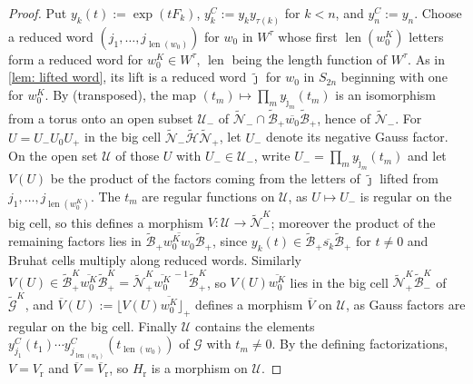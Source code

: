 \documentclass[a4paper]{amsart}
\numberwithin{equation}{section}
\theoremstyle{definition}
\theoremstyle{remark}
\newcommand{\mcG}{\mathcal{G}}
\newcommand{\mcH}{\mathcal{H}}
\newcommand{\mcN}{\mathcal{N}}
\newcommand{\mcB}{\mathcal{B}}
\newcommand{\tG}{\widetilde{\mcG}}
\newcommand{\rr}{\mathrm{r}}
\newcommand{\len}{\operatorname{len}}
\begin{document}
\begin{proof}
  Put $y_k(t):=\exp(tF_k)$, $y^C_k:=y_k y_{\tau(k)}$ for $k<n$, and $y^C_n:=y_n$.
  Choose a reduced word $(j_1,\dots,j_{\len(w_0)})$ for $w_0$ in $W^\tau$ whose first $\len(w_0^K)$ letters form a reduced word for $w_0^K\in W^\tau$, $\len$ being the length function of $W^\tau$.
  As in \cref{lem: lifted word}, its lift is a reduced word $\widetilde{\boldsymbol{\jmath}}$ for $w_0$ in $S_{2n}$ beginning with one for $w_0^K$.
  By \cite[Proposition~2.18]{FZ99} (transposed), the map $(t_m)\mapsto\prod_m y_{\widetilde{\jmath}_m}(t_m)$ is an isomorphism from a torus onto an open subset $\mathcal{U}_-$ of $\widetilde{\mcN}_-\cap\widetilde{\mcB}_+\overline{w_0}\widetilde{\mcB}_+$, hence of $\widetilde{\mcN}_-$.
  For $U=U_-U_0U_+$ in the big cell $\widetilde{\mcN}_-\widetilde{\mcH}\widetilde{\mcN}_+$, let $U_-$ denote its negative Gauss factor.
  On the open set $\mathcal{U}$ of those $U$ with $U_-\in\mathcal{U}_-$, write $U_-=\prod_m y_{\widetilde{\jmath}_m}(t_m)$ and let~$V(U)$ be the product of the factors coming from the letters of $\widetilde{\boldsymbol{\jmath}}$ lifted from $j_1,\dots,j_{\len(w_0^K)}$.
  The $t_m$ are regular functions on $\mathcal{U}$, as $U\mapsto U_-$ is regular on the big cell, so this defines a morphism $V\colon\mathcal{U}\to\widetilde{\mcN}_-^K$; moreover the product of the remaining factors lies in $\widetilde{\mcB}_+\overline{w_0^Kw_0}\widetilde{\mcB}_+$, since $y_k(t)\in\widetilde{\mcB}_+\overline{s_k}\widetilde{\mcB}_+$ for $t\neq0$ and Bruhat cells multiply along reduced words.
  Similarly $V(U)\in\widetilde{\mcB}_+^K\overline{w_0^K}\widetilde{\mcB}_+^K=\widetilde{\mcN}_+^K\overline{w_0^K}^{\,-1}\widetilde{\mcB}_+^K$, so $V(U)\overline{w_0^K}$ lies in the big cell $\widetilde{\mcN}_+^K\widetilde{\mcB}_-^K$ of $\tG^K$, and $\overline{V}(U):=\lfloor V(U)\overline{w_0^K}\rfloor_+$ defines a morphism $\overline{V}$ on $\mathcal{U}$, as Gauss factors are regular on the big cell.
  Finally $\mathcal{U}$ contains the elements $y^C_{j_1}(t_1)\cdots y^C_{j_{\len(w_0)}}(t_{\len(w_0)})$ of $\mcG$ with $t_m\neq0$.
  By the defining factorizations, $V=V_{\rr}$ and $\overline{V}=\overline{V}_{\rr}$, so $H_{\rr}$ is a morphism on $\mathcal{U}$.


\end{proof}
\end{document}
